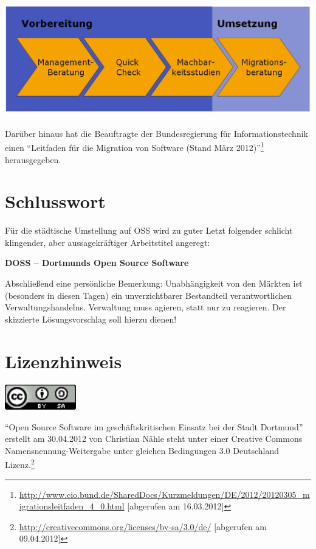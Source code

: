 \documentclass[a4paper]{scrartcl}
\begin{document}
{\centering {[abgerufen}{ }{am}{ }{13.03.2012]} }

{\centering
\includegraphics[width=6.5484in,height=1.9701in]{freiesoftwaredortmund-img2.png}
}

Darüber hinaus hat die Beauftragte der Bundesregierung für Informationstechnik
einen ``Leitfaden für die Migration von Software (Stand März
2012)''\footnote{\url{http://www.cio.bund.de/SharedDocs/Kurzmeldungen/DE/2012/20120305_migrationsleitfaden_4_0.html}
  [abgerufen am 16.03.2012]} herausgegeben.

\section{Schlusswort}

Für die städtische Umstellung auf OSS wird zu guter Letzt folgender schlicht
klingender, aber aussagekräftiger Arbeitstitel angeregt:

{\centering \textbf{DOSS -- Dortmunds Open Source Software}}

Abschließend eine persönliche Bemerkung: Unabhängigkeit von den Märkten ist
(besonders in diesen Tagen) ein unverzichtbarer Bestandteil verantwortlichen
Verwaltungshandelns.  Verwaltung muss agieren, statt nur zu reagieren. Der
skizzierte Lösungsvorschlag soll hierzu dienen!

\section{Lizenzhinweis}

{\centering 
\includegraphics[width=1.222in,height=0.4307in]{freiesoftwaredortmund-img3.png}
}


``Open Source Software im geschäftskritischen Einsatz bei der Stadt Dortmund''
erstellt am 30.04.2012 von Christian Nähle steht unter einer Creative Commons
Namensnennung-Weitergabe unter gleichen Bedingungen 3.0 Deutschland
Lizenz.\footnote{\url{http://creativecommons.org/licenses/by-sa/3.0/de/}
  [abgerufen am 09.04.2012]}
\end{document}
